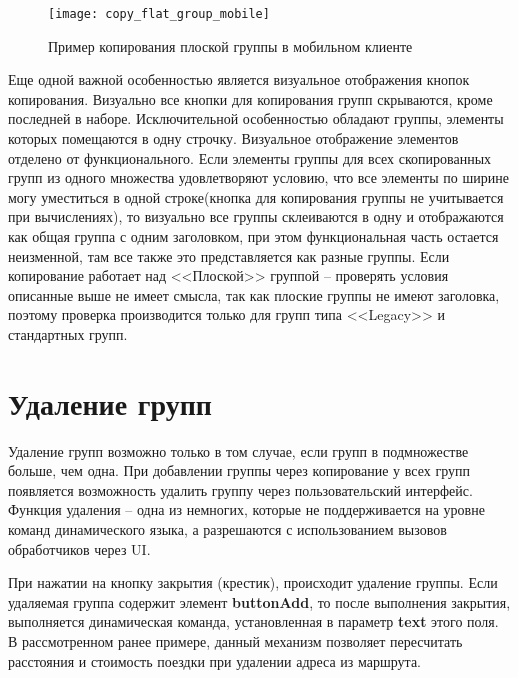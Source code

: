 \documentclass[../index.tex]{subfiles}
\begin{document}
\begin{figure}[h]
    \texttt{[image: copy\_flat\_group\_mobile]}
    \centering
    \caption{Пример копирования плоской группы в мобильном клиенте}
\end{figure}

Еще одной важной особенностью является визуальное отображения кнопок копирования. Визуально все кнопки для копирования групп скрываются, кроме последней в наборе.
Исключительной особенностью обладают группы, элементы которых помещаются в одну строчку. Визуальное отображение элементов отделено от функционального. Если элементы группы для всех скопированных групп из одного множества удовлетворяют условию, что все элементы по ширине могу уместиться в одной строке(кнопка для копирования группы не учитывается при вычислениях), то визуально все группы склеиваются в одну и отображаются как общая группа с одним заголовком, при этом функциональная часть остается неизменной, там все также это представляется как разные группы.
Если копирование работает над <<Плоской>> группой -- проверять условия описанные выше не имеет смысла, так как плоские группы не имеют заголовка, поэтому проверка производится только для групп типа <<Legacy>> и стандартных групп.

\section{Удаление групп}

Удаление групп возможно только в том случае, если групп в подмножестве больше, чем одна. При добавлении группы через копирование у всех групп появляется возможность удалить группу через пользовательский интерфейс. Функция удаления -- одна из немногих, которые не поддерживается на уровне команд динамического языка, а разрешаются с использованием вызовов обработчиков через UI.

При нажатии на кнопку закрытия (крестик), происходит удаление группы. Если удаляемая группа содержит элемент \textbf{buttonAdd}, то после выполнения закрытия, выполняется динамическая команда, установленная в параметр \textbf{text} этого поля. В рассмотренном ранее примере, данный механизм позволяет пересчитать расстояния и стоимость поездки при удалении адреса из маршрута.
\end{document}

